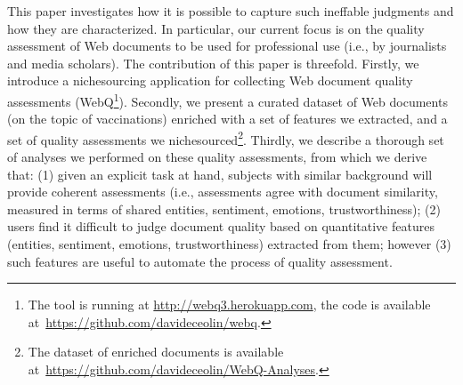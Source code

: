 \documentclass{llncs}
\begin{document}
This paper investigates how it is possible to capture such ineffable judgments and how they are characterized. In particular, our current focus is on the quality assessment of Web documents to be used for professional use (i.e., by journalists and media scholars). 
The contribution of this paper is threefold. Firstly, we introduce a nichesourcing application for collecting Web document quality assessments (WebQ\footnote{The tool is running at \url{http://webq3.herokuapp.com}, the code is available at~\url{https://github.com/davideceolin/webq}.}). Secondly, we present a curated dataset of Web documents (on the topic of vaccinations) enriched with a set of features we extracted, and a set of quality assessments we nichesourced\footnote{The dataset of enriched documents is available at~\url{https://github.com/davideceolin/WebQ-Analyses}.}. Thirdly, we describe a thorough set of analyses we performed on these quality assessments, from which we derive that: (1) given an explicit task at hand, subjects with similar background will provide coherent assessments (i.e., assessments agree with document similarity, measured in terms of shared entities, sentiment, emotions, trustworthiness);
%
%
%
%
%
(2) users find it difficult to judge document quality based on quantitative features (entities, sentiment, emotions, trustworthiness) extracted from them; however (3) such features are useful to automate the process of quality assessment.%
%
%
%
%
%
%
%
%
%
%
\end{document}
